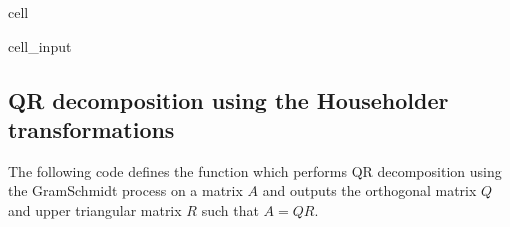 \documentclass[letterpaper,10pt,english]{jupyterBook}
\begin{document}
\begin{sphinxuseclass}{cell}
\begin{sphinxVerbatimInput}
\begin{sphinxuseclass}{cell_input}
\begin{sphinxVerbatim}[commandchars=\\\{\}]
      
\end{sphinxVerbatim}

\end{sphinxuseclass}\end{sphinxVerbatimInput}

\end{sphinxuseclass}

\subsection{QR decomposition using the Householder transformations}
\label{\detokenize{8_Appendices/8.1_Python:qr-decomposition-using-the-householder-transformations}}
\sphinxAtStartPar
The following code defines the function  which performs QR decomposition using the Gram\sphinxhyphen{}Schmidt process on a matrix \(A\) and outputs the orthogonal matrix \(Q\) and upper triangular matrix \(R\) such that \(A = QR\).
\end{document}
